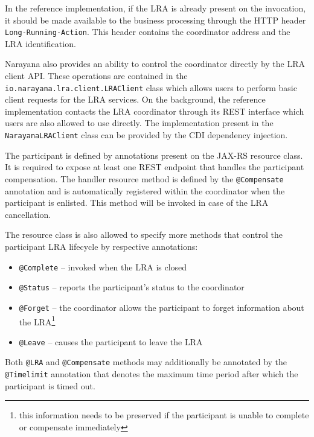 \documentclass[oneside,
  digital, %
  table,   %
  lof,     %
  lot,     %
]{fithesis3}
\begin{document}
In the reference implementation, if the LRA is already present on the invocation, it should be made available to the business processing through the HTTP header \texttt{Long-Running-Action}. This header contains the coordinator address and the LRA identification.

Narayana also provides an ability to control the coordinator directly by the LRA client API. These operations are contained in the  \texttt{io.narayana.lra.client.LRAClient} class which allows users to perform basic client requests for the LRA services. On the background, the reference implementation contacts the LRA coordinator through its REST interface which users are also allowed to use directly. The implementation present in the \texttt{NarayanaLRAClient} class can be provided by the CDI dependency injection.

The participant is defined by annotations present on the JAX-RS resource class. It is required to expose at least one REST endpoint that handles the participant compensation. The handler resource method is defined by the \texttt{@Compensate} annotation and is automatically registered within the coordinator when the participant is enlisted. This method will be invoked in case of the LRA cancellation.

The resource class is also allowed to specify more methods that control the participant LRA lifecycle by respective annotations:

\begin{itemize}
    \item \texttt{@Complete} -- invoked when the LRA is closed
    
    \item \texttt{@Status} -- reports the participant's status to the coordinator
    
    \item \texttt{@Forget} -- the coordinator allows the participant to forget information about the LRA\footnote{this information needs to be preserved if the participant is unable to complete or compensate immediately}
    
    \item \texttt{@Leave} -- causes the participant to leave the LRA
\end{itemize}

Both \texttt{@LRA} and \texttt{@Compensate} methods may additionally be annotated by the \texttt{@Timelimit} annotation that denotes the maximum time period after which the participant is timed out.
\end{document}

